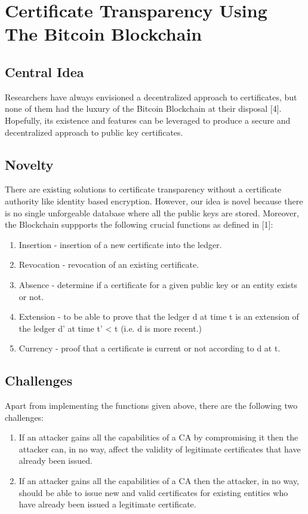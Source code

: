 \documentclass[a4paper]{article}
\begin{document}
\section{Certificate Transparency Using The Bitcoin Blockchain}
\subsection{Central Idea}
Researchers have always envisioned a decentralized approach to certificates, but none of them had the luxury of the Bitcoin Blockchain at their disposal [4]. Hopefully, its existence and features can be leveraged to produce a secure and decentralized approach to public key certificates.

\subsection{Novelty}
There are existing solutions to certificate transparency without a certificate authority like identity based encryption. However, our idea is novel because there is no single unforgeable database where all the public keys are stored. Moreover, the Blockchain suppports the following crucial functions as defined in [1]:
\begin{enumerate}
\item Insertion - insertion of a new certificate into the ledger.
\item Revocation - revocation of an existing certificate.
\item Absence - determine if a certificate for a given public key or an entity exists or not.
\item Extension - to be able to prove that the ledger d at time t is an extension of the ledger d’ at time t’ < t (i.e. d is more recent.)
\item Currency - proof that a certificate is current or not according to d at t.
\end{enumerate}

\subsection{Challenges}
Apart from implementing the functions given above, there are the following two challenges:
\begin{enumerate}
\item If an attacker gains all the capabilities of a CA by compromising it then the attacker can, in no way, affect the validity of legitimate certificates that have already been issued.
\item If an attacker gains all the capabilities of a CA then the attacker, in no way, should be able to issue new and valid certificates for existing entities who have already been issued a legitimate certificate.
\end{enumerate}
\end{document}
